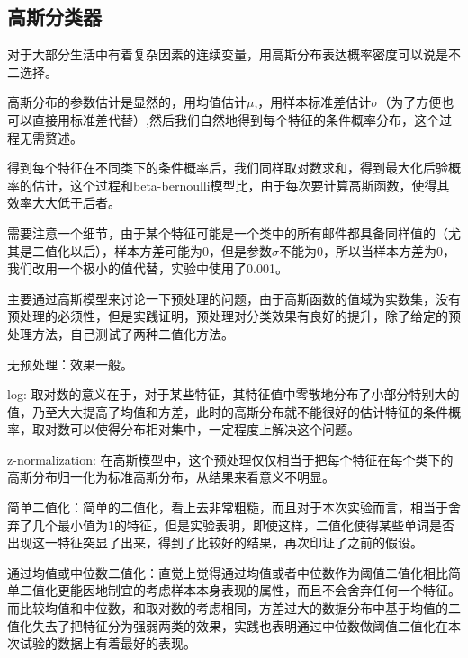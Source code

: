 \documentclass[hyperref,UTF8]{ctexart}
\begin{document}
\subsection{高斯分类器}
\par
对于大部分生活中有着复杂因素的连续变量，用高斯分布表达概率密度可以说是不二选择。
\par
高斯分布的参数估计是显然的，用均值估计$\mu$,，用样本标准差估计$\sigma$（为了方便也可以直接用标准差代替）,然后我们自然地得到每个特征的条件概率分布，这个过程无需赘述。
\par 
得到每个特征在不同类下的条件概率后，我们同样取对数求和，得到最大化后验概率的估计，这个过程和beta-bernoulli模型比，由于每次要计算高斯函数，使得其效率大大低于后者。
\par
需要注意一个细节，由于某个特征可能是一个类中的所有邮件都具备同样值的（尤其是二值化以后），样本方差可能为0，但是参数$\sigma$不能为0，所以当样本方差为0，我们改用一个极小的值代替，实验中使用了0.001。
\par
主要通过高斯模型来讨论一下预处理的问题，由于高斯函数的值域为实数集，没有预处理的必须性，但是实践证明，预处理对分类效果有良好的提升，除了给定的预处理方法，自己测试了两种二值化方法。
\par 无预处理：效果一般。
\par log: 取对数的意义在于，对于某些特征，其特征值中零散地分布了小部分特别大的值，乃至大大提高了均值和方差，此时的高斯分布就不能很好的估计特征的条件概率，取对数可以使得分布相对集中，一定程度上解决这个问题。
\par z-normalization: 在高斯模型中，这个预处理仅仅相当于把每个特征在每个类下的高斯分布归一化为标准高斯分布，从结果来看意义不明显。
\par 简单二值化：简单的二值化，看上去非常粗糙，而且对于本次实验而言，相当于舍弃了几个最小值为1的特征，但是实验表明，即使这样，二值化使得某些单词是否出现这一特征突显了出来，得到了比较好的结果，再次印证了之前的假设。
\par 通过均值或中位数二值化：直觉上觉得通过均值或者中位数作为阈值二值化相比简单二值化更能因地制宜的考虑样本本身表现的属性，而且不会舍弃任何一个特征。而比较均值和中位数，和取对数的考虑相同，方差过大的数据分布中基于均值的二值化失去了把特征分为强弱两类的效果，实践也表明通过中位数做阈值二值化在本次试验的数据上有着最好的表现。

\begin{table}[!htbp]
  \centering
\caption{不同预处理在高斯模型中的错误率}
\label{tb:lda_knn}
\end{table}





\end{document}
